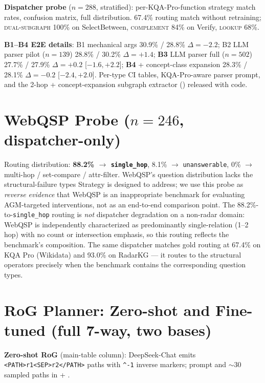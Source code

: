 \documentclass[review]{elsarticle}
\newcommand{\qtype}[1]{\texttt{\small #1}}
\newcommand{\op}[1]{\textsc{\small #1}}
\begin{document}
\textbf{Dispatcher probe} ($n\!=\!288$, stratified): per-KQA-Pro-function strategy match rates, confusion matrix, full distribution. 67.4\% routing match without retraining; \op{dual-subgraph} 100\% on SelectBetween, \op{complement} 84\% on Verify, \op{lookup} 68\%.

\textbf{B1--B4 E2E details}: B1 mechanical args 30.9\% / 28.8\% $\Delta=-2.2$; B2 LLM parser pilot ($n\!=\!139$) 28.8\% / 30.2\% $\Delta=+1.4$; \textbf{B3} LLM parser full ($n\!=\!502$) 27.7\% / 27.9\% $\Delta=+0.2$ [$-1.6, +2.2$]; \textbf{B4} + concept-class expansion 28.3\% / 28.1\% $\Delta=-0.2$ [$-2.4, +2.0$]. Per-type CI tables, KQA-Pro-aware parser prompt, and the 2-hop + concept-expansion subgraph extractor () released with code.

\section{WebQSP Probe (\texorpdfstring{$n=246$}{n=246}, dispatcher-only)}
\label{app:webqsp}

Routing distribution: \textbf{88.2\% $\to$ \qtype{single\_hop}}, 8.1\% $\to$ \qtype{unanswerable}, 0\% $\to$ multi-hop / set-compare / attr-filter. WebQSP's question distribution lacks the structural-failure types Strategy is designed to address; we use this probe as \emph{reverse evidence} that WebQSP is an inappropriate benchmark for evaluating AGM-targeted interventions, not as an end-to-end comparison point. The 88.2\%-to-\qtype{single\_hop} routing is \emph{not} dispatcher degradation on a non-radar domain: WebQSP is independently characterized as predominantly single-relation (1--2 hop) with no count or intersection emphasis, so this routing reflects the benchmark's composition. The same dispatcher matches gold routing at 67.4\% on KQA Pro (Wikidata) and 93.0\% on RadarKG --- it routes to the structural operators precisely when the benchmark contains the corresponding question types.

\section{RoG Planner: Zero-shot and Fine-tuned (full 7-way, two bases)}
\label{app:rog}

\textbf{Zero-shot RoG} (main-table column): DeepSeek-Chat emits \texttt{<PATH>r1<SEP>r2</PATH>} paths with \texttt{\^{}-1} inverse markers; prompt and ${\sim}30$ sampled paths in  + .
\end{document}
